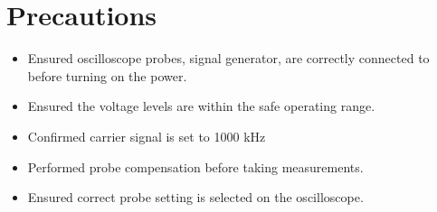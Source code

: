 \section*{Precautions}
\begin{itemize}
\item Ensured oscilloscope probes, signal generator, are correctly connected to before turning on the power.
\item Ensured the voltage levels are within the safe operating range.
\item Confirmed carrier signal is set to 1000 kHz
\item Performed probe compensation before taking measurements.
\item Ensured correct probe setting is selected on the oscilloscope.
\end{itemize}